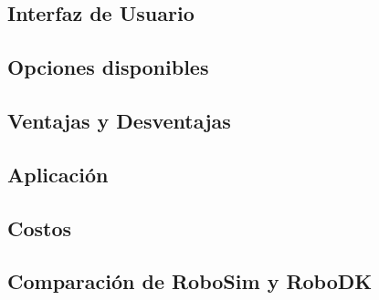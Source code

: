 \subsection{Interfaz de Usuario}


\newpage

\subsection{Opciones disponibles}


\subsection{Ventajas y Desventajas}


\subsection{Aplicación}


\subsection{Costos}


\newpage
\subsection{Comparación de RoboSim y RoboDK}


